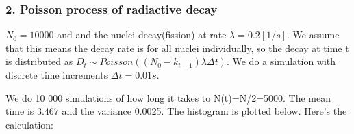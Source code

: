 \documentclass[11pt]{article}
\begin{document}
    \hypertarget{poisson-process-of-radiactive-decay}{%
\subsubsection{2. Poisson process of radiactive
decay}\label{poisson-process-of-radiactive-decay}}

\(N_0=10 000\) and and the nuclei decay(fission) at rate
\(\lambda=0.2 [1/s]\). We assume that this means the decay rate is for
all nuclei individually, so the decay at time t is distributed as
\(D_t\sim Poisson((N_0-k_{t-1})\lambda \Delta t)\). We do a simulation
with discrete time increments \(\Delta t=0.01 s\).

We do 10 000 simulations of how long it takes to N(t)=N/2=5000. The mean
time is 3.467 and the variance 0.0025. The histogram is plotted below.
Here's the calculation:
\end{document}
